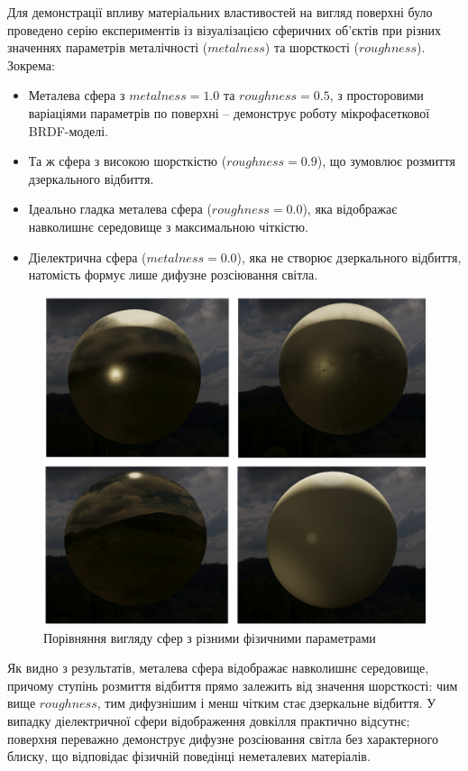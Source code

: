 \par Для демонстрації впливу матеріальних властивостей на вигляд поверхні було проведено серію експериментів із візуалізацією сферичних об’єктів при різних значеннях параметрів металічності ($metalness$) та шорст\-кос\-ті ($roughness$). Зокрема:

\begin{itemize}
\item Металева сфера з $metalness = 1.0$ та $roughness = 0.5$, з просторовими варіаціями параметрів по поверхні -- демонструє роботу мікро\-фа\-сет\-ко\-вої BRDF-моделі.
\item Та ж сфера з високою шорсткістю ($roughness = 0.9$), що зумовлює розмиття дзеркального відбиття.
\item Ідеально гладка металева сфера ($roughness = 0.0$), яка відображає навколишнє середовище з максимальною чіткістю.
\item Діелектрична сфера ($metalness = 0.0$), яка не створює дзеркального відбиття, натомість формує лише дифузне розсіювання світла.
\end{itemize}

\begin{figure}[h]
\centering
\includegraphics[width=0.8\linewidth]{Pictures/SphereComparance.png}
\caption{Порівняння вигляду сфер з різними фізичними параметрами}
\label{fig:sphere_comparison}
\end{figure}

\par Як видно з результатів, металева сфера відображає навколишнє середовище, причому ступінь розмиття відбиття прямо залежить від значення шорст\-кос\-ті: чим вище $roughness$, тим дифузнішим і менш чітким стає дзеркальне відбиття. У випадку діелектричної сфери відображення довкілля практично відсутнє; поверхня переважно демонструє дифузне розсіювання світла без характерного блиску, що відповідає фізичній поведінці неметалевих матеріалів.

